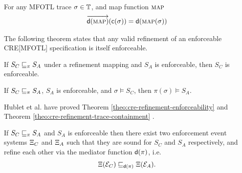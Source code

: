 \begin{lemma}
    \label{lem:cre-refinement-mediator-function}
    For any MFOTL trace $\sigma \in \mathbb{T}$, and
    map function $\textsc{\textsf{map}}$
    \begin{equation*}
        \overrightarrow{\mathsf{d}(\textsc{\textsf{map}})}(\mathsf{c}(\sigma))
        = \mathsf{d}(\textsc{\textsf{map}}(\sigma))
    \end{equation*}
\end{lemma}

The following theorem states that any valid refinement
of an enforceable CRE[MFOTL] specification is itself
enforceable.
\begin{theorem}
    \label{theo:cre-refinement-enforceability}
    If $S_C \sqsubseteq_\pi S_A$ under a refinement mapping
    and $S_A$ is enforceable, then $S_C$ is enforceable.
\end{theorem}

\begin{theorem}
    \label{theo:cre-refinement-trace-containment}
    If $S_C \sqsubseteq_\pi S_A$,
    $S_A$ is enforceable,
    and $\sigma \vDash S_C$,
    then $\pi(\sigma) \vDash S_A$.
\end{theorem}

Hublet et al. \cite{lex} have proved Theorem
\ref{theo:cre-refinement-enforceability}
\cite[Theorem 4]{lex} and Theorem
\ref{theo:cre-refinement-trace-containment}
\cite[Theorem 3]{lex}.

\begin{theorem}
    \label{theo:cre-refinement-induced-event-system-refinement}
    If $S_C \sqsubseteq_\pi S_A$ and $S_A$ is enforceable
    then there exist two enforcement event systems
    $\Xi_C$ and $\Xi_A$ such that
    they are sound for $S_C$ and $S_A$ respectively,
    and refine each other via the mediator function
    $\mathsf{d}(\pi)$, i.e.
    \begin{equation*}
        \Xi(\mathcal{E}_C) \sqsubseteq_{\mathsf{d}(\pi)} \Xi(\mathcal{E}_A).
    \end{equation*}
\end{theorem}


